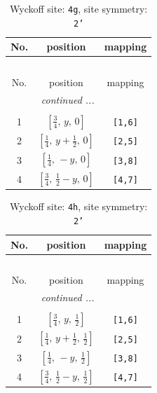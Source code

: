\documentclass[fleqn,8pt]{jsarticle}
\begin{document}
\renewcommand{\arraystretch}{1.2}
\begin{longtable}{ccc}
\caption{Wyckoff site: {\tt 4g}, site symmetry: {\tt 2'}}
 \\
 \hline \hline
No. & position & mapping \\ \hline \endfirsthead

\multicolumn{2}{l}{\tablename\ \thetable{}} \\
 \hline \hline
No. & position & mapping \\ \hline \endhead

 \hline \hline
\multicolumn{2}{r}{\footnotesize\it continued ...} \\ \endfoot

 \hline \hline
\multicolumn{2}{r}{} \\ \endlastfoot

1 & $\left[ \frac{3}{4},\, y,\, 0 \right]$ & {\tt [1,6]} \\ \hline
2 & $\left[ \frac{1}{4},\, y + \frac{1}{2},\, 0 \right]$ & {\tt [2,5]} \\ \hline
3 & $\left[ \frac{1}{4},\, - y,\, 0 \right]$ & {\tt [3,8]} \\ \hline
4 & $\left[ \frac{3}{4},\, \frac{1}{2} - y,\, 0 \right]$ & {\tt [4,7]} \\
\end{longtable}
\renewcommand{\arraystretch}{1.2}
\begin{longtable}{ccc}
\caption{Wyckoff site: {\tt 4h}, site symmetry: {\tt 2'}}
 \\
 \hline \hline
No. & position & mapping \\ \hline \endfirsthead

\multicolumn{2}{l}{\tablename\ \thetable{}} \\
 \hline \hline
No. & position & mapping \\ \hline \endhead

 \hline \hline
\multicolumn{2}{r}{\footnotesize\it continued ...} \\ \endfoot

 \hline \hline
\multicolumn{2}{r}{} \\ \endlastfoot

1 & $\left[ \frac{3}{4},\, y,\, \frac{1}{2} \right]$ & {\tt [1,6]} \\ \hline
2 & $\left[ \frac{1}{4},\, y + \frac{1}{2},\, \frac{1}{2} \right]$ & {\tt [2,5]} \\ \hline
3 & $\left[ \frac{1}{4},\, - y,\, \frac{1}{2} \right]$ & {\tt [3,8]} \\ \hline
4 & $\left[ \frac{3}{4},\, \frac{1}{2} - y,\, \frac{1}{2} \right]$ & {\tt [4,7]} \\
\end{longtable}
\end{document}
